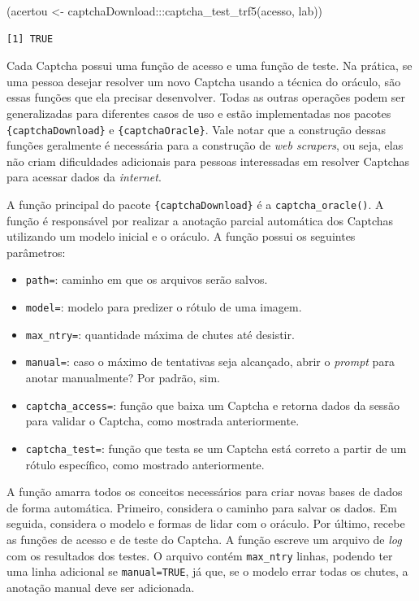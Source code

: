 \documentclass[12pt,twoside,brazilian]{book}
\newenvironment{Shaded}{\begin{snugshade}}{\end{snugshade}}
\newcommand{\FunctionTok}[1]{\textcolor[rgb]{0.28,0.35,0.67}{#1}}
\newcommand{\NormalTok}[1]{\textcolor[rgb]{0.00,0.23,0.31}{#1}}
\newcommand{\OtherTok}[1]{\textcolor[rgb]{0.00,0.23,0.31}{#1}}
\newcommand{\SpecialCharTok}[1]{\textcolor[rgb]{0.37,0.37,0.37}{#1}}
\providecommand{\tightlist}{%
  \setlength{\itemsep}{0pt}\setlength{\parskip}{0pt}}
\begin{document}
\begin{Shaded}
\begin{Highlighting}[]
\NormalTok{(acertou }\OtherTok{\textless{}{-}}\NormalTok{ captchaDownload}\SpecialCharTok{:::}\FunctionTok{captcha\_test\_trf5}\NormalTok{(acesso, lab))}
\end{Highlighting}
\end{Shaded}

\begin{verbatim}
[1] TRUE
\end{verbatim}

Cada Captcha possui uma função de acesso e uma função de teste. Na
prática, se uma pessoa desejar resolver um novo Captcha usando a técnica
do oráculo, são essas funções que ela precisar desenvolver. Todas as
outras operações podem ser generalizadas para diferentes casos de uso e
estão implementadas nos pacotes \texttt{\{captchaDownload\}} e
\texttt{\{captchaOracle\}}. Vale notar que a construção dessas funções
geralmente é necessária para a construção de \emph{web scrapers}, ou
seja, elas não criam dificuldades adicionais para pessoas interessadas
em resolver Captchas para acessar dados da \emph{internet}.

A função principal do pacote \texttt{\{captchaDownload\}} é a
\texttt{captcha\_oracle()}. A função é responsável por realizar a
anotação parcial automática dos Captchas utilizando um modelo inicial e
o oráculo. A função possui os seguintes parâmetros:

\begin{itemize}
\tightlist
\item
  \texttt{path=}: caminho em que os arquivos serão salvos.
\item
  \texttt{model=}: modelo para predizer o rótulo de uma imagem.
\item
  \texttt{max\_ntry=}: quantidade máxima de chutes até desistir.
\item
  \texttt{manual=}: caso o máximo de tentativas seja alcançado, abrir o
  \emph{prompt} para anotar manualmente? Por padrão, sim.
\item
  \texttt{captcha\_access=}: função que baixa um Captcha e retorna dados
  da sessão para validar o Captcha, como mostrada anteriormente.
\item
  \texttt{captcha\_test=}: função que testa se um Captcha está correto a
  partir de um rótulo específico, como mostrado anteriormente.
\end{itemize}

A função amarra todos os conceitos necessários para criar novas bases de
dados de forma automática. Primeiro, considera o caminho para salvar os
dados. Em seguida, considera o modelo e formas de lidar com o oráculo.
Por último, recebe as funções de acesso e de teste do Captcha. A função
escreve um arquivo de \emph{log} com os resultados dos testes. O arquivo
contém \texttt{max\_ntry} linhas, podendo ter uma linha adicional se
\texttt{manual=TRUE}, já que, se o modelo errar todas os chutes, a
anotação manual deve ser adicionada.
\end{document}
